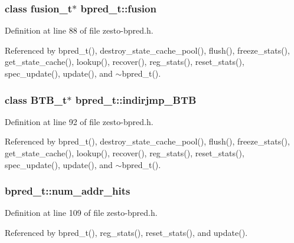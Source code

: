 \subsubsection[{fusion}]{\setlength{\rightskip}{0pt plus 5cm}class {\bf fusion\_\-t}$\ast$ {\bf bpred\_\-t::fusion}\hspace{0.3cm}{\tt  [protected]}}\label{classbpred__t_300cba846e9628def5bf6256e9b1cc87}




Definition at line 88 of file zesto-bpred.h.

Referenced by bpred\_\-t(), destroy\_\-state\_\-cache\_\-pool(), flush(), freeze\_\-stats(), get\_\-state\_\-cache(), lookup(), recover(), reg\_\-stats(), reset\_\-stats(), spec\_\-update(), update(), and $\sim$bpred\_\-t().
\subsubsection[{indirjmp\_\-BTB}]{\setlength{\rightskip}{0pt plus 5cm}class {\bf BTB\_\-t}$\ast$ {\bf bpred\_\-t::indirjmp\_\-BTB}\hspace{0.3cm}{\tt  [protected]}}\label{classbpred__t_b1c6ee96f45980916c5a25b3453e5115}




Definition at line 92 of file zesto-bpred.h.

Referenced by bpred\_\-t(), destroy\_\-state\_\-cache\_\-pool(), flush(), freeze\_\-stats(), get\_\-state\_\-cache(), lookup(), recover(), reg\_\-stats(), reset\_\-stats(), spec\_\-update(), update(), and $\sim$bpred\_\-t().
\subsubsection[{num\_\-addr\_\-hits}]{ {\bf bpred\_\-t::num\_\-addr\_\-hits}\hspace{0.3cm}{\tt  [protected]}}\label{classbpred__t_b866fbaf6482bdc5192786b4f902293f}




Definition at line 109 of file zesto-bpred.h.

Referenced by bpred\_\-t(), reg\_\-stats(), reset\_\-stats(), and update().
